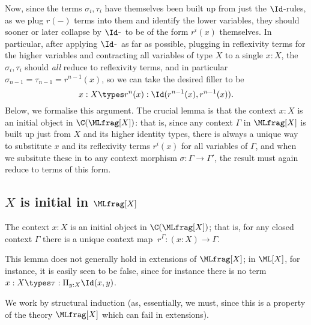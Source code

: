Now, since the terms $\sigma_i,\tau_i$ have themselves been built up from just the $\Id$-rules, as we plug $r(-)$ terms into them and identify the lower variables, they should sooner or later collapse by $\Id$-\comp\ to be of the form $r^i(x)$ themselves.  In particular, after applying $\Id$-\elim\ as far as possible, plugging in reflexivity terms for the higher variables and contracting all variables of type $X$ to a single $x:X$, the $\sigma_i, \tau_i$ should \emph{all} reduce to reflexivity terms, and in particular $\sigma_{n-1} = \tau_{n-1} = r^{n-1}(x)$, so we can take the desired filler to be
\[x:X \types r^n(x) : \Id(r^{n-1}(x),r^{n-1}(x)).\]
Below, we formalise this argument.  The crucial lemma is that the context $x:X$ is an initial object in $\C(\MLfrag[X])$: that is, since any context $\Gamma$ in $\MLfrag[X]$ is built up just from $X$ and its higher identity types, there is always a unique way to substitute $x$ and its reflexivity terms $r^i(x)$ for all variables of $\Gamma$, and when we subsitute these in to any context morphism $\sigma \colon \Gamma \to \Gamma'$, the result must again reduce to terms of this form.

\subsection{\texorpdfstring{$X$}{X} is initial in \texorpdfstring{$\MLfrag[X]$}{ML\_Id[X]}} \label{subsec:initiality}

\begin{lem} \label{lemma:initiality} The context $x:X$ is an initial object in $\C(\MLfrag[X])$; that is, for any closed context $\Gamma$ there is a unique context map $\ r^\Gamma \colon (x:X) \to \Gamma$. 
\end{lem}

\begin{rem}This lemma does not generally hold in extensions of $\MLfrag[X]$; in $\ML[X]$, for instance, it is easily seen to be false, since for instance there is no term $x:X \types \tau : \Pi_{y:X} \Id(x,y)$.
\end{rem}

\proof We work by structural induction (as, essentially, we must, since this is a property of the theory $\MLfrag[X]$ which can fail in extensions).

